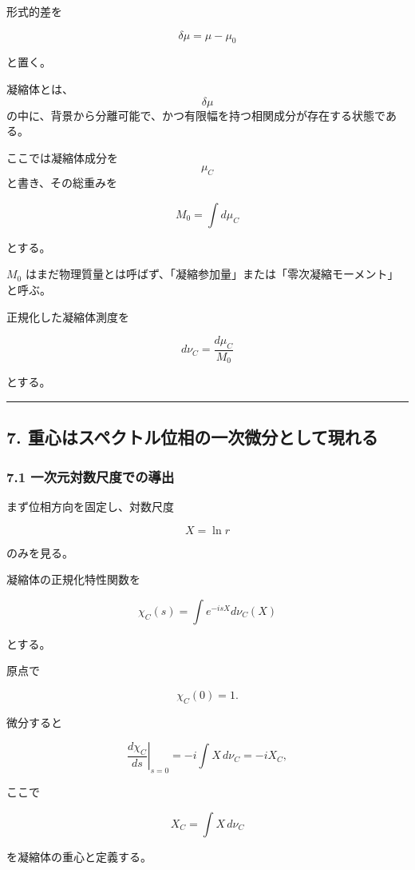 \documentclass[
  a4paper,
]{ltjsarticle}
\begin{document}
形式的差を

\[
\delta\mu
=
\mu-\mu_0
\tag{12}
\]

と置く。

凝縮体とは、\[\delta\mu\]
の中に、背景から分離可能で、かつ有限幅を持つ相関成分が存在する状態である。

ここでは凝縮体成分を \[\mu_C\] と書き、その総重みを

\[
M_0
=
\int d\mu_C
\tag{13}
\]

とする。

\(M_0\)
はまだ物理質量とは呼ばず、「凝縮参加量」または「零次凝縮モーメント」と呼ぶ。

正規化した凝縮体測度を

\[
d\nu_C
=
\frac{d\mu_C}{M_0}
\tag{14}
\]

とする。

\begin{center}\rule{0.5\linewidth}{0.5pt}\end{center}

\subsection{7.
重心はスペクトル位相の一次微分として現れる}\label{ux91cdux5fc3ux306fux30b9ux30daux30afux30c8ux30ebux4f4dux76f8ux306eux4e00ux6b21ux5faeux5206ux3068ux3057ux3066ux73feux308cux308b}

\subsubsection{7.1
一次元対数尺度での導出}\label{ux4e00ux6b21ux5143ux5bfeux6570ux5c3aux5ea6ux3067ux306eux5c0eux51fa}

まず位相方向を固定し、対数尺度

\[
X=\ln r
\]

のみを見る。

凝縮体の正規化特性関数を

\[
\chi_C(s)
=
\int
 e^{-isX}
d\nu_C(X)
\tag{15}
\]

とする。

原点で

\[
\chi_C(0)=1.
\]

微分すると

\[
\left.
\frac{d\chi_C}{ds}
\right|_{s=0}
=
-i
\int X\,d\nu_C
=
-iX_C,
\tag{16}
\]

ここで

\[
\boxed{
X_C
=
\int X\,d\nu_C
}
\tag{17}
\]

を凝縮体の重心と定義する。
\end{document}
